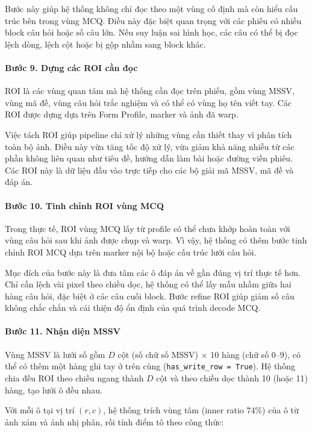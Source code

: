 Bước này giúp hệ thống không chỉ đọc theo một vùng cố định mà còn hiểu cấu trúc bên trong vùng MCQ. Điều này đặc biệt quan trọng với các phiếu có nhiều block câu hỏi hoặc số câu lớn. Nếu suy luận sai hình học, các câu có thể bị đọc lệch dòng, lệch cột hoặc bị gộp nhầm sang block khác.

\paragraph{Bước 9. Dựng các ROI cần đọc}

ROI là các vùng quan tâm mà hệ thống cần đọc trên phiếu, gồm vùng MSSV, vùng mã đề, vùng câu hỏi trắc nghiệm và có thể có vùng họ tên viết tay. Các ROI được dựng dựa trên Form Profile, marker và ảnh đã warp.

Việc tách ROI giúp pipeline chỉ xử lý những vùng cần thiết thay vì phân tích toàn bộ ảnh. Điều này vừa tăng tốc độ xử lý, vừa giảm khả năng nhiễu từ các phần không liên quan như tiêu đề, hướng dẫn làm bài hoặc đường viền phiếu. Các ROI này là dữ liệu đầu vào trực tiếp cho các bộ giải mã MSSV, mã đề và đáp án.

\paragraph{Bước 10. Tinh chỉnh ROI vùng MCQ}

Trong thực tế, ROI vùng MCQ lấy từ profile có thể chưa khớp hoàn toàn với vùng câu hỏi sau khi ảnh được chụp và warp. Vì vậy, hệ thống có thêm bước tinh chỉnh ROI MCQ dựa trên marker nội bộ hoặc cấu trúc lưới câu hỏi.

Mục đích của bước này là đưa tâm các ô đáp án về gần đúng vị trí thực tế hơn. Chỉ cần lệch vài pixel theo chiều dọc, hệ thống có thể lấy mẫu nhầm giữa hai hàng câu hỏi, đặc biệt ở các câu cuối block. Bước refine ROI giúp giảm số câu không chắc chắn và cải thiện độ ổn định của quá trình decode MCQ.

\paragraph{Bước 11. Nhận diện MSSV}

Vùng MSSV là lưới số gồm $D$ cột (số chữ số MSSV) $\times$ 10 hàng (chữ số 0--9), có thể có thêm một hàng ghi tay ở trên cùng (\texttt{has\_write\_row = True}). Hệ thống chia đều ROI theo chiều ngang thành $D$ cột và theo chiều dọc thành 10 (hoặc 11) hàng, tạo lưới ô đều nhau.

Với mỗi ô tại vị trí $(r, c)$, hệ thống trích vùng tâm (inner ratio 74\%) của ô từ ảnh xám và ảnh nhị phân, rồi tính điểm tô theo công thức:

